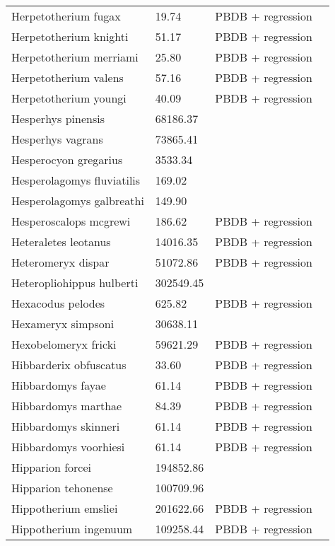 \documentclass{article}
\begin{document}
\begin{center}
\begin{longtable}{p{} p{} p{} p{}}
    Herpetotherium fugax & 19.74 & PBDB + regression &  \\ 
    Herpetotherium knighti & 51.17 & PBDB + regression &  \\ 
    Herpetotherium merriami & 25.80 & PBDB + regression &  \\ 
    Herpetotherium valens & 57.16 & PBDB + regression &  \\ 
    Herpetotherium youngi & 40.09 & PBDB + regression &  \\ 
    Hesperhys pinensis & 68186.37 & \cite{Tomiya2013} &  \\ 
    Hesperhys vagrans & 73865.41 & \cite{Tomiya2013} &  \\ 
    Hesperocyon gregarius & 3533.34 & \cite{Tomiya2013} &  \\ 
    Hesperolagomys fluviatilis & 169.02 & \cite{Tomiya2013} &  \\ 
    Hesperolagomys galbreathi & 149.90 & \cite{Tomiya2013} &  \\ 
    Hesperoscalops mcgrewi & 186.62 & PBDB + regression &  \\ 
    Heteraletes leotanus & 14016.35 & PBDB + regression &  \\ 
    Heteromeryx dispar & 51072.86 & PBDB + regression &  \\ 
    Heteropliohippus hulberti & 302549.45 & \cite{Tomiya2013} &  \\ 
    Hexacodus pelodes & 625.82 & PBDB + regression &  \\ 
    Hexameryx simpsoni & 30638.11 & \cite{Tomiya2013} &  \\ 
    Hexobelomeryx fricki & 59621.29 & PBDB + regression &  \\ 
    Hibbarderix obfuscatus & 33.60 & PBDB + regression &  \\ 
    Hibbardomys fayae & 61.14 & PBDB + regression &  \\ 
    Hibbardomys marthae & 84.39 & PBDB + regression &  \\ 
    Hibbardomys skinneri & 61.14 & PBDB + regression &  \\ 
    Hibbardomys voorhiesi & 61.14 & PBDB + regression &  \\ 
    Hipparion forcei & 194852.86 & \cite{Tomiya2013} &  \\ 
    Hipparion tehonense & 100709.96 & \cite{Tomiya2013} &  \\ 
    Hippotherium emsliei & 201622.66 & PBDB + regression &  \\ 
    Hippotherium ingenuum & 109258.44 & PBDB + regression &  \\ 

\end{longtable}
\end{center}
\end{document}
